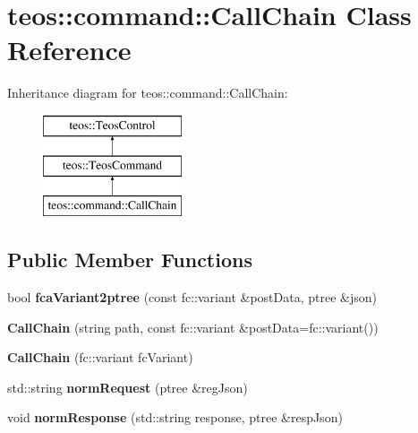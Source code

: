 \hypertarget{classteos_1_1command_1_1_call_chain}{}\section{teos\+:\+:command\+:\+:Call\+Chain Class Reference}
\label{classteos_1_1command_1_1_call_chain}
Inheritance diagram for teos\+:\+:command\+:\+:Call\+Chain\+:\begin{figure}[H]
\begin{center}
\leavevmode
\includegraphics[height=3.000000cm]{classteos_1_1command_1_1_call_chain}
\end{center}
\end{figure}
\subsection*{Public Member Functions}
\begin{DoxyCompactItemize}
\item 
\mbox{\label{classteos_1_1command_1_1_call_chain_a040b1c9a31e3a73890c6e3a4b19e98f7}} 
bool {\bfseries fca\+Variant2ptree} (const fc\+::variant \&post\+Data, ptree \&json)
\item 
\mbox{\label{classteos_1_1command_1_1_call_chain_a9f7d8b56d513bd808666e1d46ec624a5}} 
{\bfseries Call\+Chain} (string path, const fc\+::variant \&post\+Data=fc\+::variant())
\item 
\mbox{\label{classteos_1_1command_1_1_call_chain_ac7d7a03c159c1e5970bc16339bd0c25f}} 
{\bfseries Call\+Chain} (fc\+::variant fc\+Variant)
\item 
\mbox{\label{classteos_1_1command_1_1_call_chain_a967cd6e68b60916f23b6c9651f4238a5}} 
std\+::string {\bfseries norm\+Request} (ptree \&reg\+Json)
\item 
\mbox{\label{classteos_1_1command_1_1_call_chain_ac98ff4043a6ee0f8b9d3e2e4467f4988}} 
void {\bfseries norm\+Response} (std\+::string response, ptree \&resp\+Json)
\end{DoxyCompactItemize}
